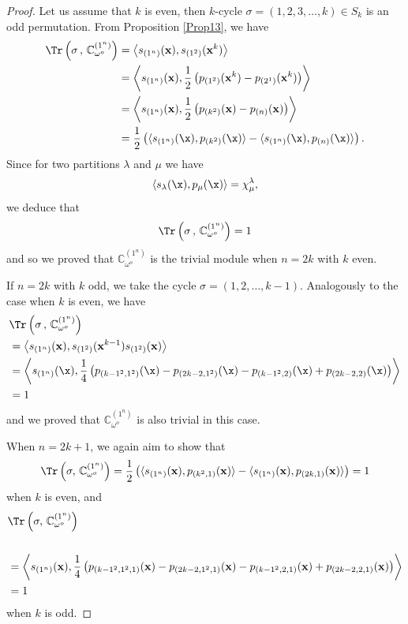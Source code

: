 \begin{proof}
	Let us assume that $k$ is even, then $k$-cycle  $\sigma=(1,2,3,\dots,k)\in S_k$ is an odd permutation.
	From Proposition \ref{Prop13}, we have
	\begin{align*}
		\Tr\left(\sigma\,,\, \mathbb{C}_{\omega^o}^{(1^n)}\right)&=\left\langle s_{(1^n)}({\bf x}),s_{(1^2)}({\bf x}^k)\right\rangle\\
		&=\left\langle s_{(1^n)}({\bf x}),\frac{1}{2}\left(p_{(1^2)}({\bf x}^k)-p_{(2^1)}({\bf x}^k)\right)\right\rangle\\
		&=\left\langle s_{(1^n)}({\bf x}),\frac{1}{2}\left(p_{(k^2)}({\bf x})-p_{(n)}({\bf x})\right)\right\rangle\\
		&=\frac{1}{2}\left(\langle s_{(1^n)}(\x),p_{(k^2)}(\x)\rangle-\langle s_{(1^n)}(\x),p_{(n)}(\x)\rangle\right).
	\end{align*}
	Since for two partitions $\lambda$ and $\mu$ we have
	$$
	\langle s_\lambda(\x),p_\mu(\x)\rangle=\chi^\lambda_\mu,
	$$
	we deduce that 
	$$
	\Tr\left(\sigma\,,\, \mathbb{C}_{\omega^o}^{(1^n)}\right)=1
	$$
	and so we proved that $\mathbb{C}^{(1^n)}_{\omega^o}$ is the trivial module when $n=2k$ with $k$ even.
	
	If $n=2k$ with $k$ odd, we take the cycle $\sigma=(1,2,\dots,k-1)$. Analogously to the case when $k$ is even, we have 
	\begin{align*}
		&\Tr\left(\sigma\,,\, \mathbb{C}_{\omega^o}^{(1^n)}\right) \\
		&=\left\langle s_{(1^n)}({\bf x}),s_{(1^2)}({\bf x}^{k-1})s_{(1^2)}({\bf x})\right\rangle
		\\
		&=  \left\langle s_{(1^n)}(\x),\frac{1}{4}\left( p_{(k-1^2,1^2)}(\x) - p_{(2k-2,1^2)}(\x) -p_{(k-1^2,2)}(\x) +  p_{(2k-2, 2)}(\x)\right)\right\rangle  \\
		&=1
	\end{align*}
	and we proved that $\mathbb{C}^{(1^n)}_{\omega^o}$ is also trivial in this case.
	
	
	
	When \(n = 2k + 1\), we again aim to show that
	\[
	\Tr\left(\sigma,\, \mathbb{C}_{\omega^o}^{(1^n)}\right) = \frac{1}{2} \left( \langle s_{(1^n)}(\mathbf{x}), p_{(k^2,1)}(\mathbf{x}) \rangle - \langle s_{(1^n)}(\mathbf{x}), p_{(2k,1)}(\mathbf{x}) \rangle \right) = 1
	\]
	when \(k\) is even, and
	\[\begin{split}
	& \Tr\left(\sigma,\, \mathbb{C}_{\omega^o}^{(1^n)}\right)\\
	\\ & = \left\langle s_{(1^n)}(\mathbf{x}), \frac{1}{4} \left( p_{(k-1^2,1^2,1)}(\mathbf{x}) - p_{(2k-2,1^2,1)}(\mathbf{x}) - p_{(k-1^2,2,1)}(\mathbf{x}) + p_{(2k-2,2,1)}(\mathbf{x}) \right) \right\rangle \\ &= 1\end{split}\]
	when \(k\) is odd.
	

\end{proof}
